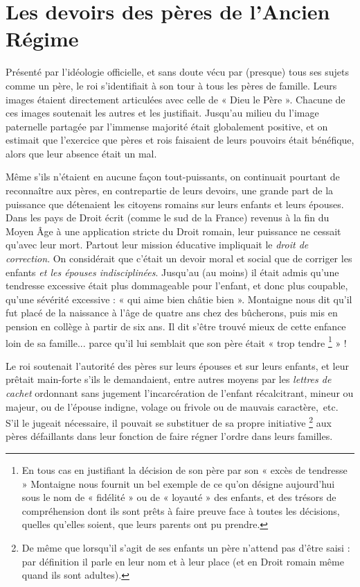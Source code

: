 
\chapter{Les devoirs des pères de l'Ancien Régime}


 Présenté par l'idéologie officielle, et sans doute vécu par (presque) tous ses sujets comme un père, le roi s'identifiait à son tour à tous les pères de famille. Leurs images étaient directement articulées avec celle de « Dieu le Père ». Chacune de ces images soutenait les autres et les justifiait. Jusqu'au milieu du  l'image paternelle partagée par l'immense majorité était globalement positive, et on estimait que l'exercice que pères et rois faisaient de leurs pouvoirs était bénéfique, alors que leur absence était un mal.

 Même s'ils n'étaient en aucune façon tout-puissants, on continuait pourtant de reconnaître aux pères, en contrepartie de leurs devoirs, une grande part de la puissance que détenaient les citoyens romains sur leurs enfants et leurs épouses. Dans les pays de Droit écrit (comme le sud de la France) revenus à la fin du Moyen Âge à une application stricte du Droit romain, leur puissance ne cessait qu'avec leur mort. Partout leur mission éducative impliquait le \emph{droit de correction}. On considérait que c'était un devoir moral et social que de corriger les enfants \emph{et les épouses indisciplinées}. Jusqu'au  (au moins) il était admis qu'une tendresse excessive était plus dommageable pour l'enfant, et donc plus coupable, qu'une sévérité excessive : « {qui aime bien châtie bien} ». Montaigne nous dit qu'il fut placé de la naissance à l'âge de quatre ans chez des bûcherons, puis mis en pension en collège à partir de six ans. Il dit s'être trouvé mieux de cette enfance loin de sa famille... parce qu'il lui semblait que son père était « trop tendre%
\footnote{En tous cas en justifiant la décision de son père par son « excès de tendresse » Montaigne nous fournit un bel exemple de ce qu'on désigne aujourd'hui sous le nom de « fidélité » ou de « loyauté » des enfants, et des trésors de compréhension dont ils sont prêts à faire preuve face à toutes les décisions, quelles qu'elles soient, que leurs parents ont pu prendre.} 
» !

 Le roi soutenait l'autorité des pères sur leurs épouses et sur leurs enfants, et leur prêtait main-forte s'ils le demandaient, entre autres moyens par les \emph{lettres de cachet} ordonnant sans jugement l'incarcération de l'enfant récalcitrant, mineur ou majeur, ou de l'épouse indigne, volage ou frivole ou de mauvais caractère,~etc. S'il le jugeait nécessaire, il pouvait se substituer de sa propre initiative%
\footnote{De même que lorsqu'il s'agit de ses enfants un père n'attend pas d'être saisi : par définition il parle en leur nom et à leur place (et en Droit romain même quand ils sont adultes).} 
aux pères défaillants dans leur fonction de faire régner l'ordre dans leurs familles. 

